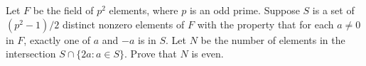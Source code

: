 Let $F$ be the field of $p^2$ elements, where $p$ is an odd
prime. Suppose $S$ is a set of $(p^2-1)/2$ distinct nonzero elements
of $F$ with the property that for each $a\neq 0$ in $F$, exactly one
of $a$ and $-a$ is in $S$. Let $N$ be the number of elements in the
intersection $S \cap \{2a: a \in S\}$. Prove that $N$ is even.
